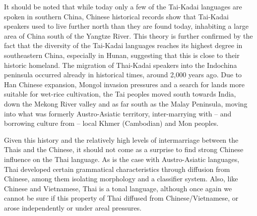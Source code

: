It should be noted that while today only a few of the Tai-Kadai languages
are spoken in southern China, Chinese historical records show that Tai-Kadai
speakers used to live further north than they are found today, inhabiting a large
area of China south of the Yangtze River. This theory is further confirmed by
the fact that the diversity of the Tai-Kadai languages reaches its highest degree
in southeastern China, especially in Hunan, suggesting that this is close to their
historic homeland. The migration of Thai-Kadai speakers into the Indochina
peninsula occurred already in historical times, around 2,000 years ago. Due
to Han Chinese expansion, Mongol invasion pressures and a search for lands
more suitable for wet-rice cultivation, the Tai peoples moved south towards
India, down the Mekong River valley and as far south as the Malay Peninsula,
moving into what was formerly Austro-Asiatic territory, inter-marrying with –
and borrowing culture from – local Khmer (Cambodian) and Mon peoples.

Given this history and the relatively high levels of intermarriage between the Thais and
the Chinese, it should not come as a surprise to find strong Chinese influence on
the Thai language. As is the case with Austro-Asiatic languages, Thai developed
certain grammatical characteristics through diffusion from Chinese, among them
isolating morphology and a classifier system. Also, like Chinese and Vietnamese,
Thai is a tonal language, although once again we cannot be sure if this property
of Thai diffused from Chinese/Vietnamese, or arose independently or under areal
pressures.




















